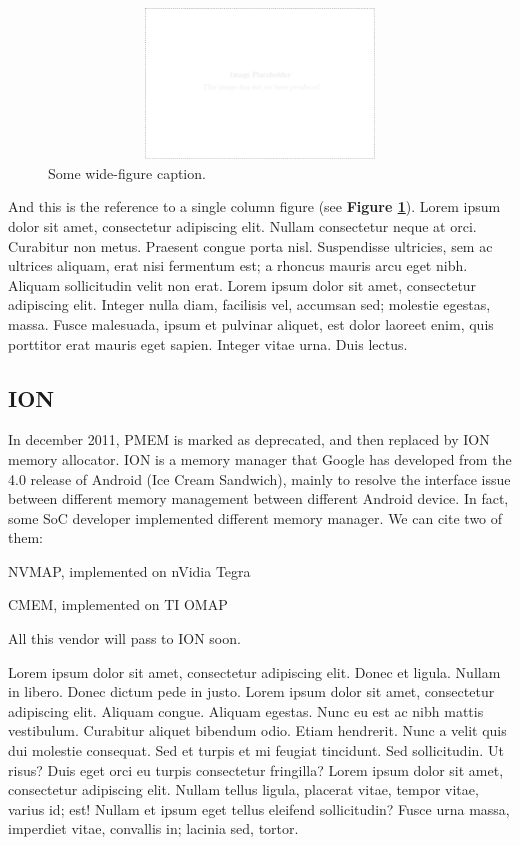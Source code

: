 \documentclass[a4paper,10pt]{article}
\begin{document}
\begin{multicols}{2}
\begin{figure}[t]
  \centering
 \includegraphics[width=16cm, height=4cm]{./eps/placeholder.eps}
 \caption{Some wide-figure caption.}
 \label{fig:myfigure2}
\end{figure}

And this is the reference to a single column figure (see {\bf Figure
\ref{fig:myfigure2}}). Lorem ipsum dolor sit amet, consectetur adipiscing elit.
Nullam consectetur neque at orci. Curabitur non metus. Praesent congue porta
nisl. Suspendisse ultricies, sem ac ultrices aliquam, erat nisi fermentum est; a
rhoncus mauris arcu eget nibh. Aliquam sollicitudin velit non erat. Lorem ipsum
dolor sit amet, consectetur adipiscing elit. Integer nulla diam, facilisis vel,
accumsan sed; molestie egestas, massa. Fusce malesuada, ipsum et pulvinar
aliquet, est dolor laoreet enim, quis porttitor erat mauris eget sapien. Integer
vitae urna. Duis lectus.

\subsection{ION}
In december 2011, PMEM is marked as deprecated, and then replaced by ION memory 
allocator.
ION is a memory manager that Google has developed from the 4.0 release
of Android (Ice Cream Sandwich), mainly to resolve the interface issue between different
memory management between different Android device.
In fact, some SoC developer implemented different memory manager. We can cite two of
them:\\
\begin{list}{}{}
 \item NVMAP, implemented on nVidia Tegra
 \item CMEM, implemented on TI OMAP
\end{list}
All this vendor will pass to ION soon.

Lorem ipsum dolor sit amet, consectetur adipiscing elit. Donec et ligula. Nullam
in libero. Donec dictum pede in justo. Lorem ipsum dolor sit amet, consectetur
adipiscing elit. Aliquam congue. Aliquam egestas. Nunc eu est ac nibh mattis
vestibulum. Curabitur aliquet bibendum odio. Etiam hendrerit. Nunc a velit quis
dui molestie consequat. Sed et turpis et mi feugiat tincidunt. Sed sollicitudin.
Ut risus? Duis eget orci eu turpis consectetur fringilla? Lorem ipsum dolor sit
amet, consectetur adipiscing elit. Nullam tellus ligula, placerat vitae, tempor
vitae, varius id; est! Nullam et ipsum eget tellus eleifend sollicitudin? Fusce
urna massa, imperdiet vitae, convallis in; lacinia sed, tortor.


\end{multicols}
\end{document}

